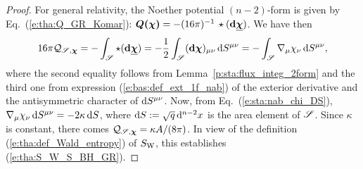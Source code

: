 \begin{proof}
For general relativity, the Noether potential $(n-2)$-form is given by Eq.~(\ref{e:tha:Q_GR_Komar}):
$\bm{Q}\textbf{(}\bm{\chi}\textbf{)} = - (16\pi)^{-1}\, \star (\mathbf{d} \underline{\bm{\chi}})$. We have then
\[
   16\pi  \mathcal{Q}_{\mathscr{S},\bm{\chi}} = - \int_{\mathscr{S}}  \star (\mathbf{d} \underline{\bm{\chi}})
    = - \frac{1}{2} \int_{\mathscr{S}} (\mathbf{d}\bm{\chi})_{\mu\nu} \, \mathrm{d} S^{\mu\nu}
    = - \int_{\mathscr{S}} \nabla_\mu \chi_\nu  \, \mathrm{d} S^{\mu\nu} ,
\]
where the second equality follows from Lemma~\ref{p:sta:flux_integ_2form}
and the third one from expression (\ref{e:bas:def_ext_1f_nab}) of the exterior
derivative and the antisymmetric character of $\mathrm{d} S^{\mu\nu}$.
Now, from Eq.~(\ref{e:sta:nab_chi_DS}),
$\nabla_\mu \chi_\nu  \, \mathrm{d} S^{\mu\nu} = -2 \kappa \, \mathrm{d} S$,
where $\mathrm{d} S := \sqrt{q}\, \mathrm{d}^{n-2} x$ is the area element of $\mathscr{S}$. Since $\kappa$
is constant, there comes $\mathcal{Q}_{\mathscr{S},\bm{\chi}}  = \kappa A/(8\pi)$.
In view of the definition (\ref{e:tha:def_Wald_entropy}) of $S_{\rm W}$,
this establishes (\ref{e:tha:S_W_S_BH_GR}).
\end{proof}

